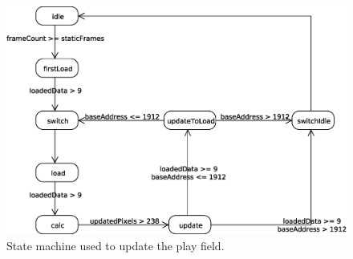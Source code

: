 \documentclass[twoside, letterpaper]{report}
\begin{document}
\begin{figure}
\centering
\includegraphics[width=7in]{./media/stateDiagram.eps}
\caption{\label{fig:state}State machine used to update the play field.}
\end{figure}
\end{document}
